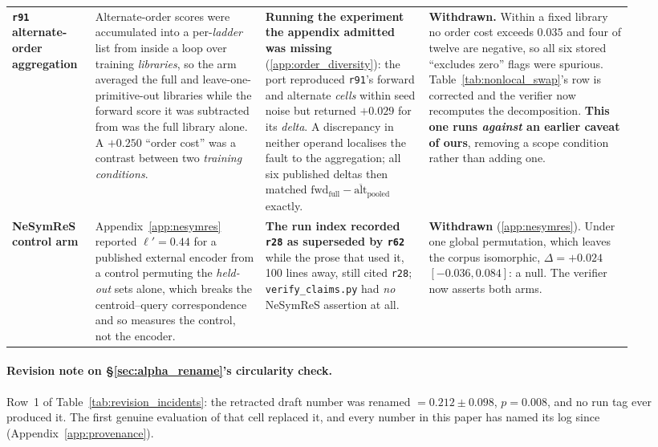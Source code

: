 \begin{table}[h]
\begin{tabular}{@{}>{\raggedright\arraybackslash}p{0.11\linewidth} >{\raggedright\arraybackslash}p{0.25\linewidth} >{\raggedright\arraybackslash}p{0.24\linewidth} >{\raggedright\arraybackslash}p{0.30\linewidth}@{}}
\textbf{\texttt{r91} alternate-order aggregation} & Alternate-order scores were accumulated into a per-\emph{ladder} list from inside a loop over training \emph{libraries}, so the arm averaged the full and leave-one-primitive-out libraries while the forward score it was subtracted from was the full library alone. A $+0.250$ ``order cost'' was a contrast between two \emph{training conditions}. & \textbf{Running the experiment the appendix admitted was missing} (\ref{app:order_diversity}): the port reproduced \texttt{r91}'s forward and alternate \emph{cells} within seed noise but returned $+0.029$ for its \emph{delta}. A discrepancy in neither operand localises the fault to the aggregation; all six published deltas then matched $\text{fwd}_{\text{full}} - \overline{\text{alt}}_{\text{pooled}}$ exactly. & \textbf{Withdrawn.} Within a fixed library no order cost exceeds $0.035$ and four of twelve are negative, so all six stored ``excludes zero'' flags were spurious. Table~\ref{tab:nonlocal_swap}'s row is corrected and the verifier now recomputes the decomposition. \textbf{This one runs \emph{against} an earlier caveat of ours}, removing a scope condition rather than adding one. \\
\textbf{NeSymReS control arm} & Appendix~\ref{app:nesymres} reported $\ell'{=}0.44$ for a published external encoder from a control permuting the \emph{held-out} sets alone, which breaks the centroid--query correspondence and so measures the control, not the encoder. & \textbf{The run index recorded \texttt{r28} as superseded by \texttt{r62}} while the prose that used it, 100 lines away, still cited \texttt{r28}; \texttt{verify\_claims.py} had \emph{no} NeSymReS assertion at all. & \textbf{Withdrawn} (\ref{app:nesymres}). Under one global permutation, which leaves the corpus isomorphic, $\Delta = +0.024$ $[-0.036, 0.084]$: a null. The verifier now asserts both arms. \\
\bottomrule
\end{tabular}
\end{table}

\paragraph{Revision note on \S\ref{sec:alpha_rename}'s circularity check.} Row~1 of Table~\ref{tab:revision_incidents}: the retracted draft number was renamed $=0.212 \pm 0.098$, $p{=}0.008$, and no run tag ever produced it. The first genuine evaluation of that cell replaced it, and every number in this paper has named its log since (Appendix~\ref{app:provenance}).

